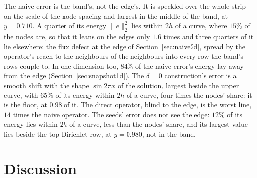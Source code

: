 \documentclass[11pt]{amsart}
\theoremstyle{definition}
\theoremstyle{remark}
\begin{document}
The naive error is the band's, not the edge's. It is speckled over the whole
strip on the scale of the node spacing and largest in the middle of the band,
at $y = 0.710$. A quarter of its energy $\|e\|_2^2$ lies within $2h$ of a
curve, where $15\%$ of the nodes are, so that it leans on the edges only
$1.6$ times and three quarters of it lie elsewhere: the flux defect at the
edge of Section~\ref{sec:naive2d}, spread by the operator's reach to the
neighbours of the neighbours into every row the band's rows couple to. In one
dimension too, $84\%$ of the naive error's energy lay away from the edge
(Section~\ref{sec:snapshot1d}). The $\delta = 0$ construction's error is a smooth shift
with the shape $\sin 2\pi x$ of the solution, largest beside the upper curve,
with $65\%$ of its energy within $2h$ of a curve, four times the nodes'
share: it is the floor, at $0.98$ of it. The direct operator, blind to the
edge, is the worst line, $14$ times the naive operator. The seeds' error does
not see the edge: $12\%$ of its energy lies within $2h$ of a curve, less than
the nodes' share, and its largest value lies beside the top Dirichlet row, at
$y = 0.980$, not in the band.

\begin{table}
  \centering
  \caption{The snapshot of Figure~\ref{fig:snapshot2d}: the RMS error over
  all nodes, the largest nodal error and where it lies, and the share of
  $\|e\|_2^2$ from the nodes within $2h$ of a curve, where $15\%$ of the nodes
  lie.}
  \label{tab:snapshot2d}
  \footnotesize
  
\end{table}

\section{Discussion}
\label{sec:discussion}
\end{document}
